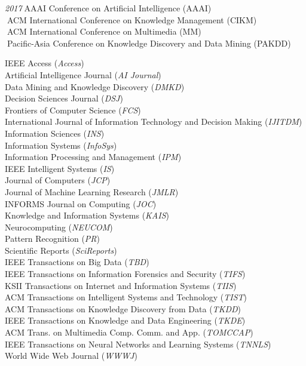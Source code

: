 \documentclass[10pt]{article}
\newenvironment{myindentpar}[1]%
{\begin{list}{}%
         {\setlength{\leftmargin}{#1}}%
         \item[]%
}
{\end{list}}
\newcounter{list}
\begin{document}
\begin{myindentpar}{0.75cm}
{\hspace{-0.75cm}\emph{2017}\textcolor{white}{.}AAAI Conference on Artificial Intelligence (AAAI) \\
\textcolor{white}{.}ACM International Conference on Knowledge Management (CIKM) \\
\textcolor{white}{.}ACM International Conference on Multimedia (MM) \\
\textcolor{white}{.}Pacific-Asia Conference on Knowledge Discovery and Data Mining (PAKDD)

}

\hspace{-0.75cm}{\bf Journal Reviewer}

{\small

IEEE Access (\textit{Access}) \\
Artificial Intelligence Journal (\textit{AI Journal}) \\
Data Mining and Knowledge Discovery (\textit{DMKD}) \\
Decision Sciences Journal (\textit{DSJ}) \\
Frontiers of Computer Science (\textit{FCS}) \\
International Journal of Information Technology and Decision Making (\textit{IJITDM}) \\
Information Sciences (\textit{INS}) \\
Information Systems (\textit{InfoSys}) \\
Information Processing and Management (\textit{IPM}) \\
IEEE Intelligent Systems (\textit{IS}) \\
Journal of Computers (\textit{JCP}) \\
Journal of Machine Learning Research (\textit{JMLR}) \\
INFORMS Journal on Computing (\textit{JOC}) \\
Knowledge and Information Systems (\textit{KAIS}) \\
Neurocomputing (\textit{NEUCOM}) \\
Pattern Recognition (\textit{PR}) \\
Scientific Reports (\textit{SciReports}) \\
IEEE Transactions on Big Data (\textit{TBD}) \\
IEEE Transactions on Information Forensics and Security (\textit{TIFS}) \\
KSII Transactions on Internet and Information Systems (\textit{TIIS}) \\
ACM Transactions on Intelligent Systems and Technology (\textit{TIST}) \\
ACM Transactions on Knowledge Discovery from Data (\textit{TKDD}) \\
IEEE Transactions on Knowledge and Data Engineering (\textit{TKDE}) \\
ACM Trans. on Multimedia Comp. Comm. and App. (\textit{TOMCCAP}) \\
IEEE Transactions on Neural Networks and Learning Systems (\textit{TNNLS}) \\
World Wide Web Journal (\textit{WWWJ})

}


\end{myindentpar}
\end{document}
